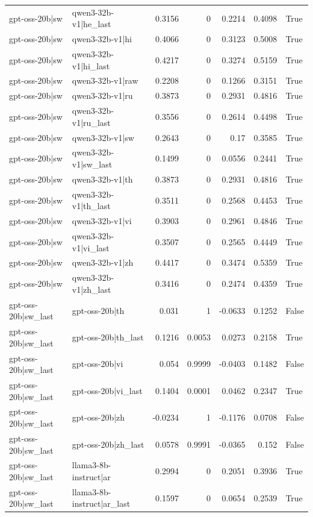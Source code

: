 \begin{table}
\begin{tabular}{l l r r r r l}
gpt-oss-20b|sw & qwen3-32b-v1|he_last & 0.3156 & 0 & 0.2214 & 0.4098 & True \\
gpt-oss-20b|sw & qwen3-32b-v1|hi & 0.4066 & 0 & 0.3123 & 0.5008 & True \\
gpt-oss-20b|sw & qwen3-32b-v1|hi_last & 0.4217 & 0 & 0.3274 & 0.5159 & True \\
gpt-oss-20b|sw & qwen3-32b-v1|raw & 0.2208 & 0 & 0.1266 & 0.3151 & True \\
gpt-oss-20b|sw & qwen3-32b-v1|ru & 0.3873 & 0 & 0.2931 & 0.4816 & True \\
gpt-oss-20b|sw & qwen3-32b-v1|ru_last & 0.3556 & 0 & 0.2614 & 0.4498 & True \\
gpt-oss-20b|sw & qwen3-32b-v1|sw & 0.2643 & 0 & 0.17 & 0.3585 & True \\
gpt-oss-20b|sw & qwen3-32b-v1|sw_last & 0.1499 & 0 & 0.0556 & 0.2441 & True \\
gpt-oss-20b|sw & qwen3-32b-v1|th & 0.3873 & 0 & 0.2931 & 0.4816 & True \\
gpt-oss-20b|sw & qwen3-32b-v1|th_last & 0.3511 & 0 & 0.2568 & 0.4453 & True \\
gpt-oss-20b|sw & qwen3-32b-v1|vi & 0.3903 & 0 & 0.2961 & 0.4846 & True \\
gpt-oss-20b|sw & qwen3-32b-v1|vi_last & 0.3507 & 0 & 0.2565 & 0.4449 & True \\
gpt-oss-20b|sw & qwen3-32b-v1|zh & 0.4417 & 0 & 0.3474 & 0.5359 & True \\
gpt-oss-20b|sw & qwen3-32b-v1|zh_last & 0.3416 & 0 & 0.2474 & 0.4359 & True \\
gpt-oss-20b|sw_last & gpt-oss-20b|th & 0.031 & 1 & -0.0633 & 0.1252 & False \\
gpt-oss-20b|sw_last & gpt-oss-20b|th_last & 0.1216 & 0.0053 & 0.0273 & 0.2158 & True \\
gpt-oss-20b|sw_last & gpt-oss-20b|vi & 0.054 & 0.9999 & -0.0403 & 0.1482 & False \\
gpt-oss-20b|sw_last & gpt-oss-20b|vi_last & 0.1404 & 0.0001 & 0.0462 & 0.2347 & True \\
gpt-oss-20b|sw_last & gpt-oss-20b|zh & -0.0234 & 1 & -0.1176 & 0.0708 & False \\
gpt-oss-20b|sw_last & gpt-oss-20b|zh_last & 0.0578 & 0.9991 & -0.0365 & 0.152 & False \\
gpt-oss-20b|sw_last & llama3-8b-instruct|ar & 0.2994 & 0 & 0.2051 & 0.3936 & True \\
gpt-oss-20b|sw_last & llama3-8b-instruct|ar_last & 0.1597 & 0 & 0.0654 & 0.2539 & True \\

\end{tabular}
\end{table}
